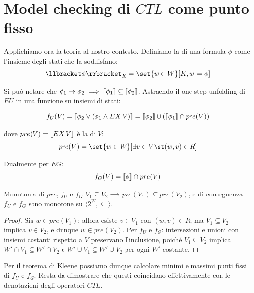 \section{Model checking di \(CTL\) come punto fisso}

Applichiamo ora la teoria al nostro contesto. Definiamo la  di una formula \(\phi\) come l'insieme degli stati che la soddisfano:
\[\den{\phi}[][K] = \set{w \in W}[K,w\models \phi]\]

Si può notare che \(\phi_1 \to \phi_2 \implies \den{\phi_1} \subseteq \den{\phi_2}\). Astraendo il one-step unfolding di \(EU\) in una funzione su insiemi di stati:

\[f_U (V) = \den{\phi_2 \lor (\phi_1 \land EX\, V)} = \den{\phi_2} \cup \left(\den{\phi_1}\cap pre(V)\right) \]

dove \(pre(V) = \den{EX\, V}\) è la  di \(V\):
\[pre(V) = \set{w \in W}[\exists v \in V\st (w,v) \in R]\]

Dualmente per \(EG\):
\[f_G (V) = \den{\phi} \cap pre(V)\]

\begin{proposition}{Monotonia di \(pre\), \(f_U\) e \(f_G\)}
  \(V_1 \subseteq V_2 \implies pre(V_1)\subseteq pre(V_2)\), e di conseguenza \(f_U\) e \(f_G\) sono monotone su \(\langle 2^W, \subseteq\rangle\).
\end{proposition}
\begin{proof}
  Sia \(w \in pre(V_1)\): allora esiste \(v \in V_1\) con \((w,v) \in R\); ma \(V_1 \subseteq V_2\) implica \(v \in V_2\), e dunque \(w \in pre(V_2)\).
  Per \(f_U\) e \(f_G\): intersezioni e unioni con insiemi costanti rispetto a \(V\) preservano l'inclusione, poiché \(V_1 \subseteq V_2\) implica \(W'\cap V_1 \subseteq W'\cap V_2\) e \(W'\cup V_1 \subseteq W'\cup V_2\) per ogni \(W'\) costante.
\end{proof}

Per il teorema di Kleene possiamo dunque calcolare minimi e massimi punti fissi di \(f_U\) e \(f_G\). Resta da dimostrare che questi coincidano effettivamente con le denotazioni degli operatori \(CTL\)\@.

